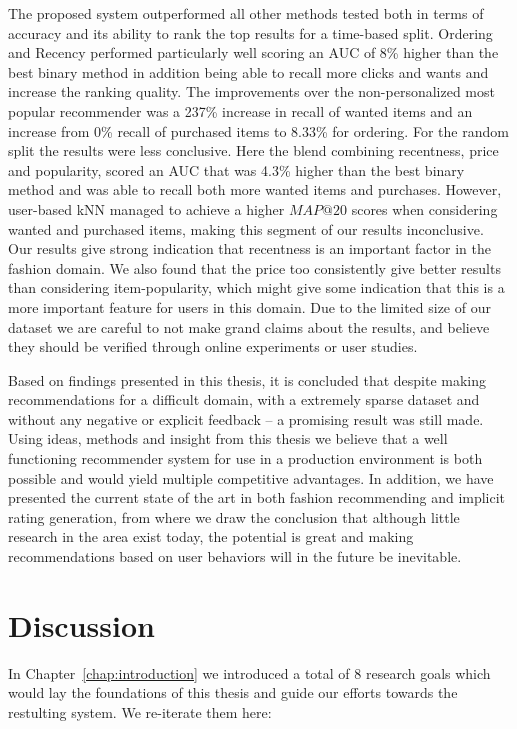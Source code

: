 The proposed system outperformed all other methods tested both in terms of
accuracy and its ability to rank the top results for a time-based split.
Ordering and Recency performed particularly well scoring an AUC of 8\% higher
than the best binary method in addition being able to recall more clicks and
wants and increase the ranking quality. The improvements over the
non-personalized most popular recommender was a 237\% increase in recall of
wanted items and an increase from 0\% recall of purchased items to 8.33\% for
ordering. For the random split the results were less conclusive.  Here the
blend combining recentness, price and popularity, scored an AUC that was 4.3\%
higher than the best binary method and was able to recall both more wanted
items and purchases. However, user-based kNN managed to achieve a higher
$MAP@20$ scores when considering wanted and purchased items, making this
segment of our results inconclusive. Our results give strong indication that
recentness is an important factor in the fashion domain. We also found that the
price too consistently give better results than considering item-popularity,
which might give some indication that this is a more important feature for
users in this domain. Due to the limited size of our dataset we are careful to
not make grand claims about the results, and believe they should be verified
through online experiments or user studies.

Based on findings presented in this thesis, it is concluded that despite making
recommendations for a difficult domain, with a extremely sparse dataset and
without any negative or explicit feedback -- a promising result was still made.
Using ideas, methods and insight from this thesis we believe that a well
functioning recommender system for use in a production environment is both
possible and would yield multiple competitive advantages. In addition, we have
presented the current state of the art in both fashion recommending and
implicit rating generation, from where we draw the conclusion that although
little research in the area exist today, the potential is great and making
recommendations based on user behaviors will in the future be inevitable.

\section{Discussion}

In Chapter~\ref{chap:introduction} we introduced a total of 8 research goals
which would lay the foundations of this thesis and guide our efforts towards
the restulting system. We re-iterate them here:

